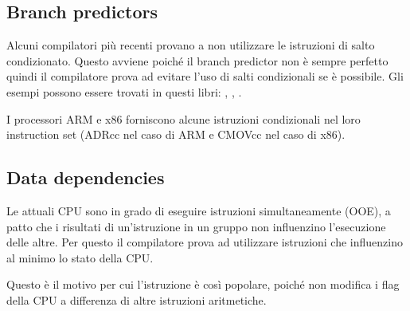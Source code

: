 ﻿

\subsection{Branch predictors}
\label{branch_predictors}

Alcuni compilatori più recenti provano a non utilizzare le istruzioni di salto condizionato.
Questo avviene poiché il branch predictor non è sempre perfetto quindi il compilatore prova ad evitare l'uso di salti condizionali se è possibile.
Gli esempi possono essere trovati in questi libri: , , .


I processori ARM e x86 forniscono alcune istruzioni condizionali nel loro instruction set (ADRcc nel caso di ARM e CMOVcc nel caso di x86).

\subsection{Data dependencies}

Le attuali CPU sono in grado di eseguire istruzioni simultaneamente (\ac{OOE}), a patto che i risultati di un'istruzione in un gruppo non influenzino l'esecuzione delle altre.
Per questo il compilatore prova ad utilizzare istruzioni che influenzino al minimo lo stato della CPU.

Questo è il motivo per cui l'istruzione \LEA è così popolare, poiché non modifica i flag della CPU a differenza di altre istruzioni aritmetiche.
